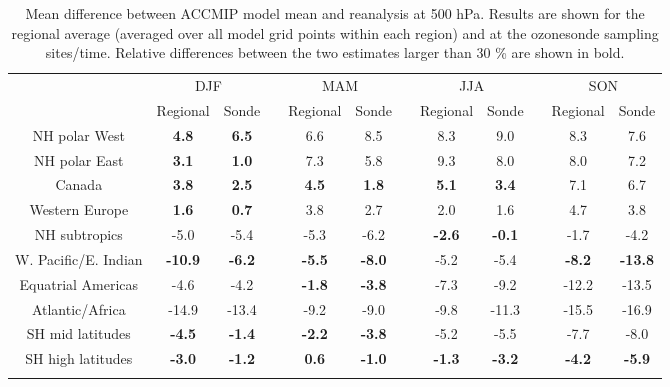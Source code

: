 \begin{table} 
\caption{ 
Mean difference between ACCMIP model mean and reanalysis at 500 hPa. Results are shown for the regional average (averaged over all model grid points within each region) and at the ozonesonde sampling sites/time. Relative differences between the two estimates larger than 30 \% are shown in bold. 
} 
\begin{tabular}{cccrccrccrcc} \tophline 
&\multicolumn{2}{c}{DJF} &&\multicolumn{2}{c}{MAM} &&\multicolumn{2}{c}{JJA} &&\multicolumn{2}{c}{SON} \\ 
\cline{2-4} \cline{5-6} \cline{8-9} \cline{11-12} 
& Regional & Sonde && Regional & Sonde && Regional & Sonde && Regional & Sonde \\ 
\middlehline 
NH polar West & \bf{4.8} & \bf{6.5} && 6.6 & 8.5 & & 8.3 & 9.0 && 8.3 & 7.6 \\ 
NH polar East & \bf{3.1} & \bf{1.0} && 7.3 & 5.8 & & 9.3 & 8.0 && 8.0 & 7.2 \\ 
Canada & \bf{3.8} & \bf{2.5} && \bf{4.5} & \bf{1.8} & & \bf{5.1} & \bf{3.4} && 7.1 & 6.7 \\ 
Western Europe & \bf{1.6} & \bf{0.7} && 3.8 & 2.7 & & 2.0 & 1.6 && 4.7 & 3.8 \\ 
NH subtropics & -5.0 & -5.4 && -5.3 & -6.2 & & \bf{-2.6} & \bf{-0.1} && -1.7 & -4.2 \\ 
W. Pacific/E. Indian & \bf{-10.9} & \bf{-6.2} && \bf{-5.5} & \bf{-8.0} & & -5.2 & -5.4 && \bf{-8.2} & \bf{-13.8} \\ 
Equatrial Americas & -4.6 & -4.2 && \bf{-1.8} & \bf{-3.8} & & -7.3 & -9.2 && -12.2 & -13.5 \\ 
Atlantic/Africa & -14.9 & -13.4 && -9.2 & -9.0 & & -9.8 & -11.3 && -15.5 & -16.9 \\ 
SH mid latitudes & \bf{-4.5} & \bf{-1.4} && \bf{-2.2} & \bf{-3.8} & & -5.2 & -5.5 && -7.7 & -8.0 \\ 
SH high latitudes & \bf{-3.0} & \bf{-1.2} && \bf{0.6} & \bf{-1.0} & & \bf{-1.3} & \bf{-3.2} && \bf{-4.2} & \bf{-5.9} \\ 
\bottomhline 
\end{tabular} 
\end{table}